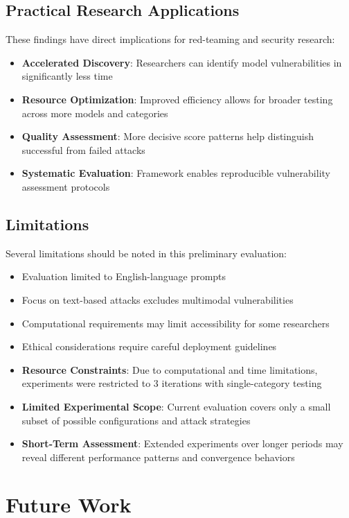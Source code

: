 \documentclass[11pt,twocolumn]{article}
\begin{document}
\subsection{Practical Research Applications}

These findings have direct implications for red-teaming and security research:

\begin{itemize}
\item \textbf{Accelerated Discovery}: Researchers can identify model vulnerabilities in significantly less time
\item \textbf{Resource Optimization}: Improved efficiency allows for broader testing across more models and categories
\item \textbf{Quality Assessment}: More decisive score patterns help distinguish successful from failed attacks
\item \textbf{Systematic Evaluation}: Framework enables reproducible vulnerability assessment protocols
\end{itemize}

\subsection{Limitations}

Several limitations should be noted in this preliminary evaluation:

\begin{itemize}
\item Evaluation limited to English-language prompts
\item Focus on text-based attacks excludes multimodal vulnerabilities  
\item Computational requirements may limit accessibility for some researchers
\item Ethical considerations require careful deployment guidelines
\item \textbf{Resource Constraints}: Due to computational and time limitations, experiments were restricted to 3 iterations with single-category testing
\item \textbf{Limited Experimental Scope}: Current evaluation covers only a small subset of possible configurations and attack strategies
\item \textbf{Short-Term Assessment}: Extended experiments over longer periods may reveal different performance patterns and convergence behaviors
\end{itemize}

\section{Future Work}
\end{document}
